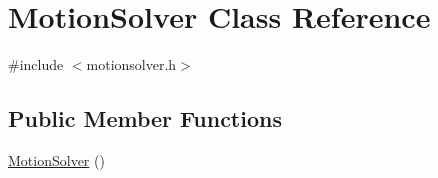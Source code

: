 \hypertarget{class_motion_solver}{\section{Motion\-Solver Class Reference}
\label{class_motion_solver}
}


{\ttfamily \#include $<$motionsolver.\-h$>$}

\subsection*{Public Member Functions}
\begin{DoxyCompactItemize}
\item 
\hypertarget{class_motion_solver_a4dbc64bfeff4aab69a723c142292f787}{\hyperlink{class_motion_solver_a4dbc64bfeff4aab69a723c142292f787}{Motion\-Solver} ()}\label{class_motion_solver_a4dbc64bfeff4aab69a723c142292f787}


\end{DoxyCompactItemize}
